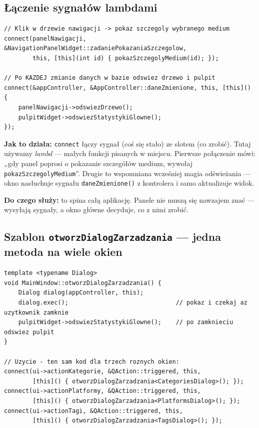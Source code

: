 \documentclass[11pt,a4paper]{article}
\begin{document}
\subsection{Łączenie sygnałów lambdami}

\begin{lstlisting}[caption={Reakcje na zdarzenia z paneli}]
// Klik w drzewie nawigacji -> pokaz szczegoly wybranego medium
connect(panelNawigacji, &NavigationPanelWidget::zadaniePokazaniaSzczegolow,
        this, [this](int id) { pokazSzczegolyMedium(id); });

// Po KAZDEJ zmianie danych w bazie odswiez drzewo i pulpit
connect(&appController, &AppController::daneZmienione, this, [this]() {
    panelNawigacji->odswiezDrzewo();
    pulpitWidget->odswiezStatystykiGlowne();
});
\end{lstlisting}

\textbf{Jak to działa:} \texttt{connect} łączy sygnał (coś się stało) ze slotem
(co zrobić). Tutaj używamy \emph{lambd} --- małych funkcji pisanych w miejscu.
Pierwsze połączenie mówi: „gdy panel poprosi o pokazanie szczegółów medium,
wywołaj \texttt{pokazSzczegolyMedium}”. Drugie to wspomniana wcześniej magia
odświeżania --- okno nasłuchuje sygnału \texttt{daneZmienione()} z kontrolera
i samo aktualizuje widok.

\textbf{Do czego służy:} to spina całą aplikację. Panele nie muszą się nawzajem
znać --- wysyłają sygnały, a okno główne decyduje, co z nimi zrobić.

\subsection{Szablon \texttt{otworzDialogZarzadzania} --- jedna metoda na wiele okien}

\begin{lstlisting}[caption={Generyczne otwieranie dialogów}]
template <typename Dialog>
void MainWindow::otworzDialogZarzadzania() {
    Dialog dialog(appController, this);
    dialog.exec();                              // pokaz i czekaj az uzytkownik zamknie
    pulpitWidget->odswiezStatystykiGlowne();    // po zamknieciu odswiez pulpit
}

// Uzycie - ten sam kod dla trzech roznych okien:
connect(ui->actionKategorie, &QAction::triggered, this,
        [this]() { otworzDialogZarzadzania<CategoriesDialog>(); });
connect(ui->actionPlatformy, &QAction::triggered, this,
        [this]() { otworzDialogZarzadzania<PlatformsDialog>(); });
connect(ui->actionTagi, &QAction::triggered, this,
        [this]() { otworzDialogZarzadzania<TagsDialog>(); });
\end{lstlisting}
\end{document}
